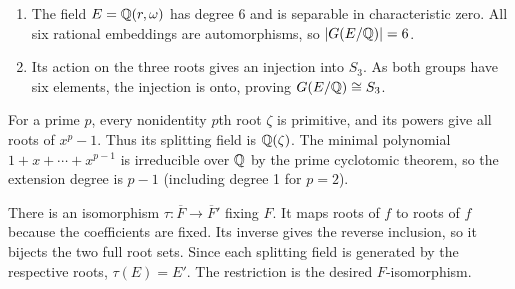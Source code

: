 \begin{enumerate}[label=(\alph*)]
\item The field $E=\mathbb{Q}(r,\omega)$ has degree 6 and is separable in characteristic zero. All six rational embeddings are automorphisms, so $|G(E/\mathbb{Q})|=6$.
\item Its action on the three roots gives an injection into $S_3$. As both groups have six elements, the injection is onto, proving $G(E/\mathbb{Q})\cong S_3$.
\end{enumerate}

For a prime $p$, every nonidentity $p$th root $\zeta$ is primitive, and its powers give all roots of $x^p-1$. Thus its splitting field is $\mathbb{Q}(\zeta)$. The minimal polynomial $1+x+\cdots+x^{p-1}$ is irreducible over $\mathbb{Q}$ by the prime cyclotomic theorem, so the extension degree is $p-1$ (including degree 1 for $p=2$).

There is an isomorphism $\tau:\overline F\to\overline F'$ fixing $F$. It maps roots of $f$ to roots of $f$ because the coefficients are fixed. Its inverse gives the reverse inclusion, so it bijects the two full root sets. Since each splitting field is generated by the respective roots, $\tau(E)=E'$. The restriction is the desired $F$-isomorphism.

